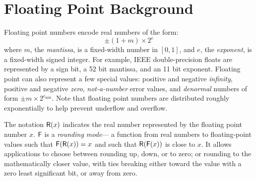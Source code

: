 \documentclass[paper.tex]{subfiles}
\begin{document}
\section{Floating Point Background}
\label{sec:background}


Floating point numbers encode real numbers of the form:
\[ \pm (1 + m) \times 2^e \]%
where $m$, the \emph{mantissa}, is a fixed-width number in $[0, 1]$,
and $e$, the \emph{exponent}, is a fixed-width signed integer.  For
example, IEEE double-precision floats are represented by a sign bit, a
52 bit mantissa, and an 11 bit exponent.  Floating point can also
represent a few special values: positive and negative \emph{infinity},
positive and negative \emph{zero}, \emph{not-a-number} error values,
and \emph{denormal} numbers of form $\pm m \times 2^{e_{\text{min}}}$.
Note that floating point numbers are distributed roughly exponentially
to help prevent underflow and overflow.


The notation $\mathsf{R}(x)$ indicates the real number represented by the
floating point number $x$.  $\mathsf{F}$ is a \emph{rounding mode}---%
a function from real numbers to floating-point values such that
$\mathsf{F}(\mathsf{R}(x)) = x$ and such that $\mathsf{R}(\mathsf{F}(x))$ is close to $x$.  It allows
applications to choose between rounding up, down, or to zero; or
rounding to the mathematically closer value, with ties breaking either
toward the value with a zero least significant bit, or away from zero.
\end{document}
